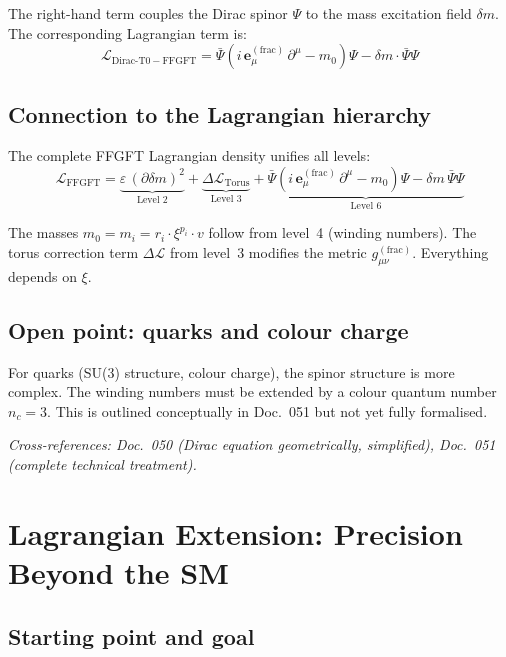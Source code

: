 The right-hand term couples the Dirac spinor $\Psi$ to the mass
excitation field $\delta m$. The corresponding Lagrangian term is:
\begin{equation}
    \mathcal{L}_{\mathrm{Dirac\text{-}T0-FFGFT}}
    = \bar{\Psi}\left(i\,\mathbf{e}_\mu^{(\mathrm{frac})}\,\partial^\mu
    - m_0\right)\Psi - \delta m \cdot \bar{\Psi}\Psi
\end{equation}

\subsection{Connection to the Lagrangian hierarchy}

The complete FFGFT Lagrangian density unifies all levels:
\begin{equation}
    \boxed{
    \mathcal{L}_{\mathrm{FFGFT}} =
    \underbrace{\varepsilon\,(\partial\delta m)^2}_{\text{Level 2}}
    + \underbrace{\Delta\mathcal{L}_{\mathrm{Torus}}}_{\text{Level 3}}
    + \underbrace{\bar{\Psi}(i\,\mathbf{e}_\mu^{(\mathrm{frac})}\,\partial^\mu
    - m_0)\Psi - \delta m\,\bar{\Psi}\Psi}_{\text{Level 6}}
    }
\end{equation}

The masses $m_0 = m_i = r_i \cdot \xi^{p_i} \cdot v$ follow from
level~4 (winding numbers). The torus correction term
$\Delta\mathcal{L}$ from level~3 modifies the metric
$g_{\mu\nu}^{(\mathrm{frac})}$. Everything depends on $\xi$.

\subsection{Open point: quarks and colour charge}

For quarks (SU(3) structure, colour charge), the spinor structure
is more complex. The winding numbers must be extended by a colour
quantum number $n_c = 3$. This is outlined conceptually in Doc.~051
but not yet fully formalised.

\noindent\textit{Cross-references: Doc.~050 (Dirac equation geometrically,
simplified), Doc.~051 (complete technical treatment).}

\section{Lagrangian Extension: Precision Beyond the \texorpdfstring{SM}{SM}}

\subsection{Starting point and goal}

